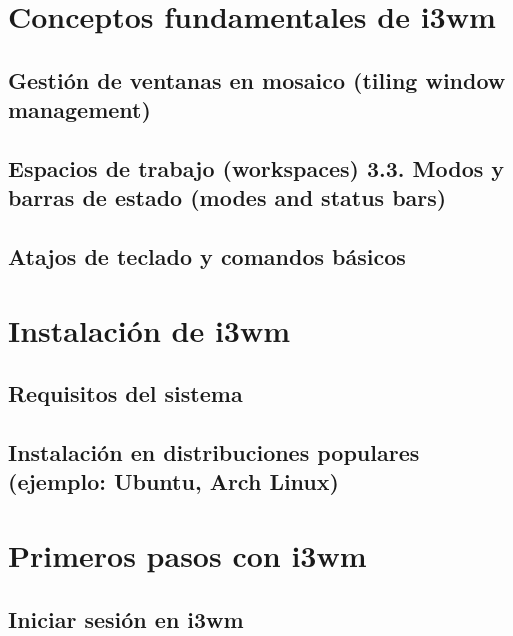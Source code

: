\documentclass[
  jou,
  floatsintext,
  longtable,
  a4paper,
  nolmodern,
  notxfonts,
  notimes,
  12pt,
  colorlinks=true,linkcolor=blue,citecolor=blue,urlcolor=blue]{apa7}
\begin{document}
\section{Conceptos fundamentales de
i3wm}\label{conceptos-fundamentales-de-i3wm}

\subsection{Gestión de ventanas en mosaico (tiling window
management)}\label{gestiuxf3n-de-ventanas-en-mosaico-tiling-window-management}

\subsection{Espacios de trabajo (workspaces) 3.3. Modos y barras de
estado (modes and status
bars)}\label{espacios-de-trabajo-workspaces-3.3.-modos-y-barras-de-estado-modes-and-status-bars}

\subsection{Atajos de teclado y comandos
básicos}\label{atajos-de-teclado-y-comandos-buxe1sicos}

\section{Instalación de i3wm}\label{instalaciuxf3n-de-i3wm}

\subsection{Requisitos del sistema}\label{requisitos-del-sistema}

\subsection{Instalación en distribuciones populares (ejemplo: Ubuntu,
Arch
Linux)}\label{instalaciuxf3n-en-distribuciones-populares-ejemplo-ubuntu-arch-linux}

\section{Primeros pasos con i3wm}\label{primeros-pasos-con-i3wm}

\subsection{Iniciar sesión en i3wm}\label{iniciar-sesiuxf3n-en-i3wm}
\end{document}

